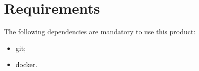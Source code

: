 \section{Requirements}

The following dependencies are mandatory to use this product:
\begin{itemize}
   \item git;
   \item docker.
\end{itemize}